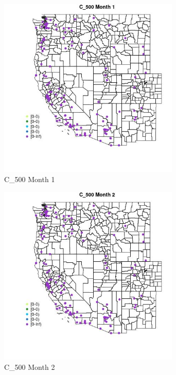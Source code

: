 \begin{figure} 
\centering  
\includegraphics[width=0.77\textwidth]{Code_Outputs/Report_ML_input_PM25_Step4_part_e_de_duplicated_aves_MapObsMo1C_500.jpg} 
\caption{\label{fig:Report_ML_input_PM25_Step4_part_e_de_duplicated_avesMapObsMo1C_500}C_500 Month 1} 
\end{figure} 
 

\begin{figure} 
\centering  
\includegraphics[width=0.77\textwidth]{Code_Outputs/Report_ML_input_PM25_Step4_part_e_de_duplicated_aves_MapObsMo2C_500.jpg} 
\caption{\label{fig:Report_ML_input_PM25_Step4_part_e_de_duplicated_avesMapObsMo2C_500}C_500 Month 2} 
\end{figure} 
 


